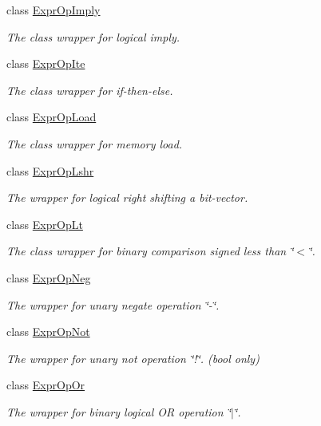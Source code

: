 \begin{DoxyCompactItemize}
class \mbox{\hyperlink{classilang_1_1_expr_op_imply}{Expr\+Op\+Imply}}
\begin{DoxyCompactList}\small\item\em The class wrapper for logical imply. \end{DoxyCompactList}\item 
class \mbox{\hyperlink{classilang_1_1_expr_op_ite}{Expr\+Op\+Ite}}
\begin{DoxyCompactList}\small\item\em The class wrapper for if-\/then-\/else. \end{DoxyCompactList}\item 
class \mbox{\hyperlink{classilang_1_1_expr_op_load}{Expr\+Op\+Load}}
\begin{DoxyCompactList}\small\item\em The class wrapper for memory load. \end{DoxyCompactList}\item 
class \mbox{\hyperlink{classilang_1_1_expr_op_lshr}{Expr\+Op\+Lshr}}
\begin{DoxyCompactList}\small\item\em The wrapper for logical right shifting a bit-\/vector. \end{DoxyCompactList}\item 
class \mbox{\hyperlink{classilang_1_1_expr_op_lt}{Expr\+Op\+Lt}}
\begin{DoxyCompactList}\small\item\em The class wrapper for binary comparison signed less than \char`\"{}$<$\char`\"{}. \end{DoxyCompactList}\item 
class \mbox{\hyperlink{classilang_1_1_expr_op_neg}{Expr\+Op\+Neg}}
\begin{DoxyCompactList}\small\item\em The wrapper for unary negate operation \char`\"{}-\/\char`\"{}. \end{DoxyCompactList}\item 
class \mbox{\hyperlink{classilang_1_1_expr_op_not}{Expr\+Op\+Not}}
\begin{DoxyCompactList}\small\item\em The wrapper for unary not operation \char`\"{}!\char`\"{}. (bool only) \end{DoxyCompactList}\item 
class \mbox{\hyperlink{classilang_1_1_expr_op_or}{Expr\+Op\+Or}}
\begin{DoxyCompactList}\small\item\em The wrapper for binary logical OR operation \char`\"{}$\vert$\char`\"{}. \end{DoxyCompactList}\item 

\end{DoxyCompactItemize}
